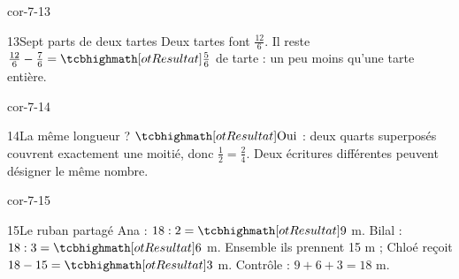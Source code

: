 \begin{blocLivre}{cor-7-13}\begin{corrige}{13}{Sept parts de deux tartes}
Deux tartes font $\frac{12}6$. Il reste $\frac{12}6-\frac76=\res{\frac56}$ de tarte : un peu moins qu’une tarte entière.
\end{corrige}\end{blocLivre}
\begin{blocLivre}{cor-7-14}\begin{corrige}{14}{La même longueur ?}
$\res{\text{Oui}}$ : deux quarts superposés couvrent exactement une moitié, donc $\frac12=\frac24$. Deux écritures différentes peuvent désigner le même nombre.
\label{fig-cor-7-14}
\end{corrige}\end{blocLivre}
\begin{blocLivre}{cor-7-15}\begin{corrige}{15}{Le ruban partagé}
Ana : $18:2=\res9$ m. Bilal : $18:3=\res6$ m. Ensemble ils prennent 15 m ; Chloé reçoit $18-15=\res3$ m. Contrôle : $9+6+3=18$ m.
\end{corrige}\end{blocLivre}
